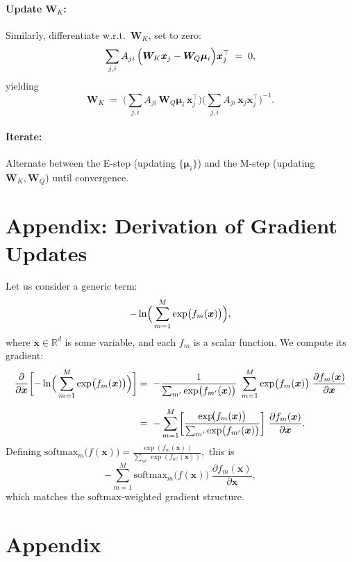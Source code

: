 \documentclass{article}
\begin{document}
    \paragraph{Update \(\bm{W}_K\):}
    Similarly, differentiate w.r.t.\ \(\bm{W}_K\), set to zero:
    \[
    \sum_{j,i}A_{ji}\,
    \Bigl(\bm{W}_K\bm{x}_j - \bm{W}_Q\bm{\mu}_i\Bigr)
    \bm{x}_j^\top
    \;=\;0,
    \]
    yielding
    \[
    \bm{W}_K
    \;=\;
    \Biggl(
    \sum_{j,i}A_{ji}\,
    \bm{W}_Q\bm{\mu}_i\,\bm{x}_j^\top
    \Biggr)
    \Biggl(\sum_{j,i}A_{ji}\,
    \bm{x}_j\bm{x}_j^\top
    \Biggr)^{-1}.
    \]
    
    \paragraph{Iterate:}
    Alternate between the E-step (updating \(\{\bm{\mu}_i\}\)) and the M-step (updating \(\bm{W}_K,\bm{W}_Q\)) until convergence.


  
    
    
\clearpage
\appendix

\section{Appendix: Derivation of Gradient Updates}

Let us consider a generic term:
\[
-\ln \Bigl(\,\sum_{m=1}^M \exp \bigl(f_m(\bm{x})\bigr)\Bigr),
\]
where \(\bm{x}\in \mathbb{R}^d\) is some variable, and each \(f_m\) is a scalar function.
We compute its gradient:
\begin{align*}
\frac{\partial}{\partial \bm{x}}
\biggl[
-\ln \Bigl(\,\sum_{m=1}^M \exp \bigl(f_m(\bm{x})\bigr)\Bigr)
\biggr]
&=\;
-\frac{1}{\sum_{m'} \exp \bigl(f_{m'}(\bm{x})\bigr)}
\;\sum_{m=1}^M
\exp \bigl(f_m(\bm{x})\bigr)\;\frac{\partial f_m(\bm{x})}{\partial \bm{x}}
\\[6pt]
&=\;
-\sum_{m=1}^M
\biggl[
\frac{\exp\!\bigl(f_m(\bm{x})\bigr)}{\sum_{m'} \exp \bigl(f_{m'}(\bm{x})\bigr)}
\biggr]
\;\frac{\partial f_m(\bm{x})}{\partial \bm{x}}.
\end{align*}
Defining
\(\mathrm{softmax}_m\bigl(f(\bm{x})\bigr) 
= 
\tfrac{\exp(f_m(\bm{x}))}{\sum_{m'} \exp(f_{m'}(\bm{x}))},\)
this is
\[
-\sum_{m=1}^M
\mathrm{softmax}_m \bigl(f(\bm{x})\bigr)
\;\frac{\partial f_m(\bm{x})}{\partial \bm{x}},
\]
which matches the \(\mathrm{softmax}\)-weighted gradient structure.


\section{Appendix}
\label{sec:deriv-sim-models}
\end{document}
